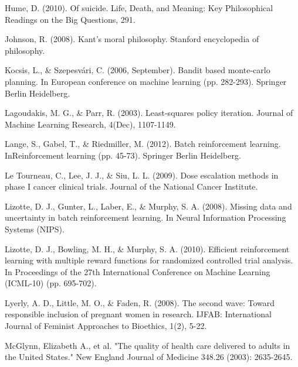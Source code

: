 \documentclass[]{spie}  %
\begin{document}
\skiplinehalf

\indent Hume, D. (2010). Of suicide. Life, Death, and Meaning: Key Philosophical Readings on the Big Questions, 291.

\skiplinehalf

\indent Johnson, R. (2008). Kant's moral philosophy. Stanford encyclopedia of philosophy.

\skiplinehalf

\indent Kocsis, L., & Szepesvári, C. (2006, September). Bandit based monte-carlo planning. In European conference on machine learning (pp. 282-293). Springer Berlin Heidelberg.

\skiplinehalf

\indent Lagoudakis, M. G., & Parr, R. (2003). Least-squares policy iteration. Journal of Machine Learning Research, 4(Dec), 1107-1149.

\skiplinehalf

\indent Lange, S., Gabel, T., & Riedmiller, M. (2012). Batch reinforcement learning. InReinforcement learning (pp. 45-73). Springer Berlin Heidelberg.

\skiplinehalf

\indent Le Tourneau, C., Lee, J. J., & Siu, L. L. (2009). Dose escalation methods in phase I cancer clinical trials. Journal of the National Cancer Institute.

\skiplinehalf

\indent Lizotte, D. J., Gunter, L., Laber, E., & Murphy, S. A. (2008). Missing data and uncertainty in batch reinforcement learning. In Neural Information Processing Systems (NIPS).

\skiplinehalf

\indent Lizotte, D. J., Bowling, M. H., & Murphy, S. A. (2010). Efficient reinforcement learning with multiple reward functions for randomized controlled trial analysis. In Proceedings of the 27th International Conference on Machine Learning (ICML-10) (pp. 695-702).

\skiplinehalf

\indent Lyerly, A. D., Little, M. O., & Faden, R. (2008). The second wave: Toward responsible inclusion of pregnant women in research. IJFAB: International Journal of Feminist Approaches to Bioethics, 1(2), 5-22.

\skiplinehalf

\indent McGlynn, Elizabeth A., et al. "The quality of health care delivered to adults in the United States." New England Journal of Medicine 348.26 (2003): 2635-2645.
\end{document}
